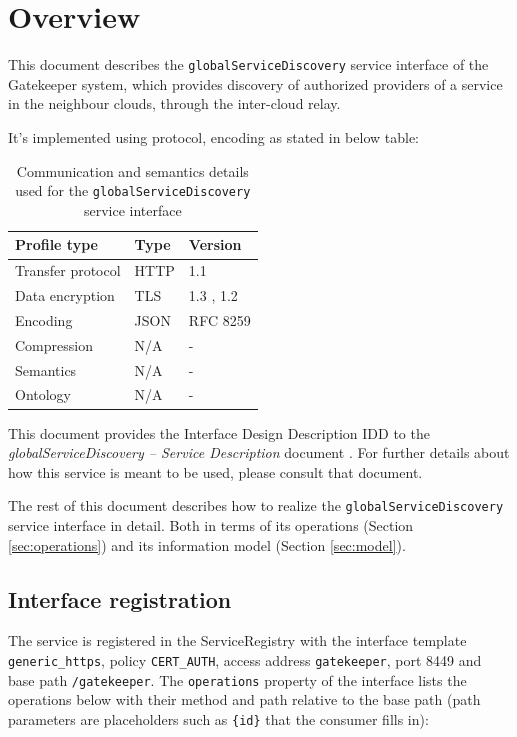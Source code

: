 \documentclass[a4paper]{arrowhead}
\begin{document}
\section{Overview}
\label{sec:overview}

This document describes the \texttt{global\allowbreak{}Service\allowbreak{}Discovery} service interface of the Gatekeeper system, which provides discovery of authorized providers of a service in the neighbour clouds, through the inter-cloud relay.

It's implemented using protocol, encoding as stated in below table:
\begin{table}[ht!]
  \centering
  \begin{tabular}{|l|l|l|}
    \hline
    \rowcolor{gray!33} Profile type & Type & Version \\ \hline
    Transfer protocol & HTTP & 1.1 \cite{rfc9112} \\ \hline
    Data encryption & TLS & 1.3 \cite{rfc8446}, 1.2 \cite{rfc5246} \\ \hline
    Encoding & JSON & RFC 8259 \cite{rfc8259} \\ \hline
    Compression & N/A & - \\ \hline
    Semantics & N/A & - \\ \hline
    Ontology & N/A & - \\ \hline
  \end{tabular}
  \caption{Communication and semantics details used for the \texttt{global\allowbreak{}Service\allowbreak{}Discovery} service interface}
  \label{tab:comunication_semantics_profile}
\end{table}

This document provides the Interface Design Description IDD to the \textit{globalServiceDiscovery -- Service Description} document \cite{gk-globalServiceDiscovery-sd}.
For further details about how this service is meant to be used, please consult that document.

The rest of this document describes how to realize the \texttt{global\allowbreak{}Service\allowbreak{}Discovery} service
interface in detail. Both in terms of its operations (Section \ref{sec:operations}) and its information model (Section \ref{sec:model}).

\subsection{Interface registration}

The service is registered in the ServiceRegistry with the interface template \texttt{generic\_\allowbreak{}https}, policy \texttt{CERT\_\allowbreak{}AUTH}, access address \texttt{gatekeeper}, port 8449 and base path \texttt{/\allowbreak{}gatekeeper}. The \texttt{operations} property of the interface lists the operations below with their method and path relative to the base path (path parameters are placeholders such as \texttt{\{id\}} that the consumer fills in):
\end{document}

